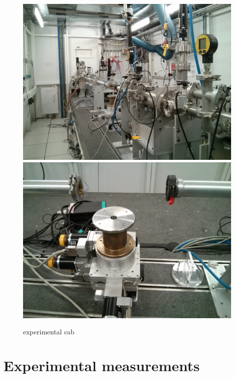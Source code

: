 \documentclass[11pt,a4paper,oneside]{article}
\begin{document}
\begin{figure}[H]
    \begin{center}
        \includegraphics[scale=0.07]{Images/IMG_20151210_203229.jpg}
        \includegraphics[scale=0.07]{Images/IMG_20151210_203316.jpg}
        \caption{experimental cab}
        \label{ligne_mesure}
    \end{center}
\end{figure}
\medskip


\newpage



\section{Experimental measurements}
\end{document}
